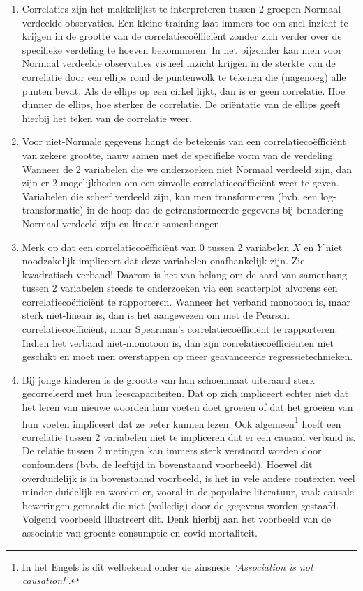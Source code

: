 \documentclass[
  12pt,dutch,coursenotes]{book}
\begin{document}
\begin{enumerate}
\def\labelenumi{\arabic{enumi}.}
\item
  Correlaties zijn het makkelijkst te interpreteren tussen 2 groepen Normaal verdeelde observaties. Een kleine training laat immers toe om snel inzicht te krijgen in de grootte van de correlatiecoëfficiënt zonder zich verder over de specifieke verdeling te hoeven bekommeren. In het bijzonder kan men voor Normaal verdeelde observaties visueel inzicht krijgen in de sterkte van de correlatie door een ellips rond de puntenwolk te tekenen die (nagenoeg) alle punten bevat. Als de ellips op een cirkel lijkt, dan is er geen correlatie. Hoe dunner de ellips, hoe sterker de correlatie. De oriëntatie van de ellips geeft hierbij het teken van de correlatie weer.
\item
  Voor niet-Normale gegevens hangt de betekenis van een correlatiecoëfficiënt van zekere grootte, nauw samen met de specifieke vorm van de verdeling. Wanneer de 2 variabelen die we onderzoeken niet Normaal verdeeld zijn, dan zijn er 2 mogelijkheden om een zinvolle correlatiecoëfficiënt weer te geven. Variabelen die scheef verdeeld zijn, kan men transformeren (bvb. een log-transformatie) in de hoop dat de getransformeerde gegevens bij benadering Normaal verdeeld zijn en lineair samenhangen.
\item
  Merk op dat een correlatiecoëfficiënt van 0 tussen 2 variabelen \(X\) en \(Y\) niet noodzakelijk impliceert dat deze variabelen onafhankelijk zijn. Zie kwadratisch verband! Daarom is het van belang om de aard van samenhang tussen 2 variabelen steeds te onderzoeken via een scatterplot alvorens een correlatiecoëfficiënt te rapporteren. Wanneer het verband monotoon is, maar sterk niet-lineair is, dan is het aangewezen om niet de Pearson correlatiecoëfficiënt, maar Spearman's correlatiecoëfficiënt te rapporteren. Indien het verband niet-monotoon is, dan zijn correlatiecoëfficiënten niet geschikt en moet men overstappen op meer geavanceerde regressietechnieken.
\item
  Bij jonge kinderen is de grootte van hun schoenmaat uiteraard sterk gecorreleerd met hun leescapaciteiten. Dat op zich impliceert echter niet dat het leren van nieuwe woorden hun voeten doet groeien of dat het groeien van hun voeten impliceert dat ze beter kunnen lezen. Ook algemeen\footnote{In het Engels is dit welbekend onder de zinsnede \emph{`Association is not causation!'}.} hoeft een correlatie tussen 2 variabelen niet te impliceren dat er een causaal verband is. De relatie tussen 2 metingen kan immers sterk verstoord worden door confounders (bvb. de leeftijd in bovenstaand voorbeeld). Hoewel dit overduidelijk is in bovenstaand voorbeeld, is het in vele andere contexten veel minder duidelijk en worden er, vooral in de populaire literatuur, vaak causale beweringen gemaakt die niet (volledig) door de gegevens worden gestaafd. Volgend voorbeeld illustreert dit. Denk hierbij aan het voorbeeld van de associatie van groente consumptie en covid mortaliteit.

\end{enumerate}
\end{document}
